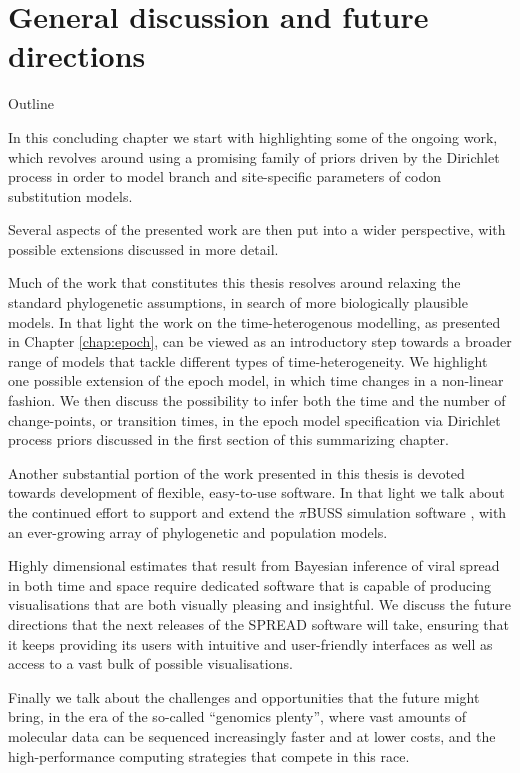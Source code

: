 \chapter{General discussion and future directions}

\begin{remark}{Outline}

In this concluding chapter we start with highlighting some of the ongoing work, which revolves around using a promising family of priors driven by the Dirichlet process in order to model branch and site-specific parameters of codon substitution models.

Several aspects of the presented work are then put into a wider perspective, with possible extensions discussed in more detail. 

Much of the work that constitutes this thesis resolves around relaxing the standard phylogenetic assumptions, in search of more biologically plausible models. 
In that light the work on the time-heterogenous modelling, as presented in Chapter \ref{chap:epoch}, can be viewed as an introductory step towards a broader range of models that tackle different types of time-heterogeneity.
We highlight one possible extension of the epoch model, in which time changes in a non-linear fashion.
We then discuss the possibility to infer both the time and the number of change-points, or transition times, in the epoch model specification via Dirichlet process priors discussed in the first section of this summarizing chapter. 

Another substantial portion of the work presented in this thesis is devoted towards development of flexible, easy-to-use software.
In that light we talk about the continued effort to support and extend the $\pi$BUSS simulation software \citep{Bielejec2014b}, with an ever-growing array of phylogenetic and population models.

Highly dimensional estimates that result from Bayesian inference of viral spread in both time and space require dedicated software that is capable of producing visualisations that are both visually pleasing and insightful.
We discuss the future directions that the next releases of the SPREAD software \citep{Bielejec2011} will take, ensuring that it keeps providing its users with intuitive and user-friendly interfaces as well as access to a vast bulk of possible visualisations.

Finally we talk about the challenges and opportunities that the future might bring, in the era of the so-called ``genomics plenty'', where vast amounts of molecular data can be sequenced increasingly faster and at lower costs, and the high-performance computing strategies that compete in this race.
\end{remark}

